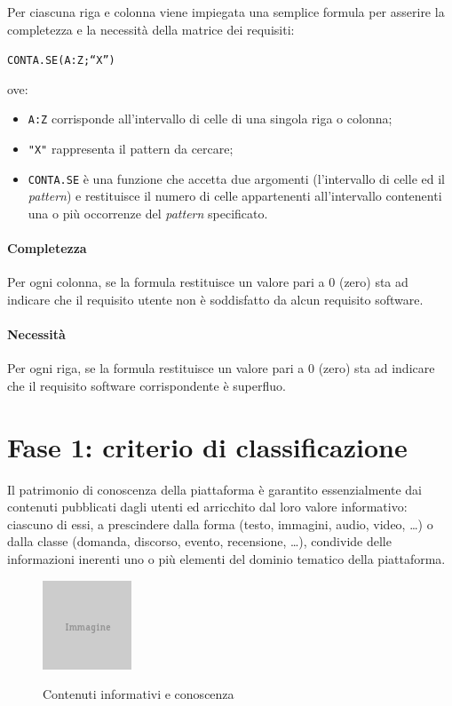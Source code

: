 Per ciascuna riga e colonna viene impiegata una semplice formula per asserire la completezza e la necessità della matrice dei requisiti:  
\begin{center}
\texttt{CONTA.SE(A:Z;``X'')}   
\end{center}
ove:
\begin{itemize}
\item \texttt{A:Z} corrisponde all'intervallo di celle di una singola riga o colonna;
\item \texttt{"X"} rappresenta il pattern da cercare;
\item \texttt{CONTA.SE} è una funzione che accetta due argomenti (l'intervallo di celle ed il \textit{pattern}) e restituisce il numero di celle appartenenti all'intervallo contenenti una o più occorrenze del \textit{pattern} specificato.
\end{itemize}

\paragraph{Completezza} Per ogni colonna, se la formula restituisce un valore pari a 0 (zero) sta ad indicare che il requisito utente non è soddisfatto da alcun requisito software.

\paragraph{Necessità} Per ogni riga, se la formula restituisce un valore pari a 0 (zero) sta ad indicare che il requisito software corrispondente è superfluo.

\section{Fase 1: criterio di classificazione}
\label{sec:tesi:stage:fase-1}
Il patrimonio di conoscenza della piattaforma è garantito essenzialmente dai contenuti pubblicati dagli utenti ed arricchito dal loro valore informativo: ciascuno di essi, a prescindere dalla forma (testo, immagini, audio, video, \ldots) o dalla classe (domanda, discorso, evento, recensione, \ldots), condivide delle informazioni inerenti uno o più elementi del dominio tematico della piattaforma.

\begin{figure}[ht]
\begin{center}
 \includegraphics{placeholder.png}
 \label{fig:tesi:stage:classificazione:serbatoio-contenuti}
 \caption{Contenuti informativi e conoscenza}
\end{center}
\end{figure}

